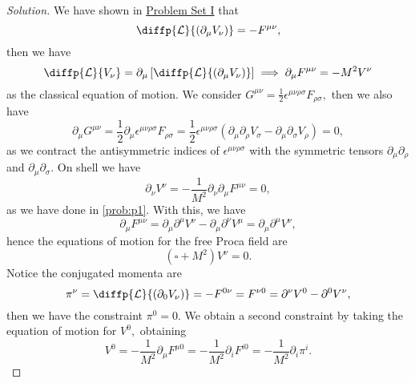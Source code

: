 \begin{proof}[Solution]
   We have shown in \href{https://github.com/louisradial/4305107-quantum-field-theory-i/releases/tag/pset1}{Problem Set I} that
   \begin{equation*}
      \diffp{\mathcal{L}}{(\partial_\mu V_\nu)} = -F^{\mu \nu},
   \end{equation*}
   then we have
   \begin{equation*}
      \diffp{\mathcal{L}}{V_\nu} = \partial_\mu \left[\diffp{\mathcal{L}}{(\partial_\mu V_\nu)}\right] \implies \partial_\mu F^{\mu\nu} = - M^2 V^\nu
   \end{equation*}
   as the classical equation of motion. We consider \(G^{\mu\nu} = \frac12 \epsilon^{\mu \nu \rho \sigma} F_{\rho \sigma},\) then we also have
   \begin{equation*}
      \partial_\mu G^{\mu\nu} = \frac12 \partial_\mu \epsilon^{\mu \nu \rho \sigma} F_{\rho \sigma} = \frac12  \epsilon^{\mu\nu \rho \sigma} \left(\partial_\mu\partial_{\rho}V_{\sigma} - \partial_\mu \partial_{\sigma} V_{\rho}\right) = 0,
   \end{equation*}
   as we contract the antisymmetric indices of \(\epsilon^{\mu\nu \rho \sigma}\) with the symmetric tensors \(\partial_\mu \partial_\rho\) and \(\partial_\mu \partial_\sigma.\) On shell we have
   \begin{equation*}
      \partial_\nu V^\nu = -\frac{1}{M^2}\partial_\nu \partial_\mu F^{\mu\nu} = 0,
   \end{equation*}
   as we have done in \cref{prob:p1}. With this, we have
   \begin{equation*}
      \partial_\mu F^{\mu\nu} = \partial_\mu \partial^\mu V^\nu - \partial_\mu \partial^\nu V^\mu = \partial_\mu \partial^\mu V^\nu,
   \end{equation*}
   hence the equations of motion for the free Proca field are
   \begin{equation*}
      (\square + M^2)V^\nu = 0.
   \end{equation*}
   Notice the conjugated momenta are
   \begin{equation*}
      \pi^{\nu} = \diffp{\mathcal{L}}{(\partial_0 V_\nu)} = -F^{0\nu} = F^{\nu 0} = \partial^\nu V^0 - \partial^0 V^\nu,
   \end{equation*}
   then we have the constraint \(\pi^0 = 0.\) We obtain a second constraint by taking the equation of motion for \(V^0,\) obtaining
   \begin{equation*}
      V^0 = -\frac{1}{M^2}\partial_\mu F^{\mu0} = -\frac{1}{M^2}\partial_i F^{i0} = -\frac{1}{M^2} \partial_i \pi^i.
   \end{equation*}


\end{proof}
